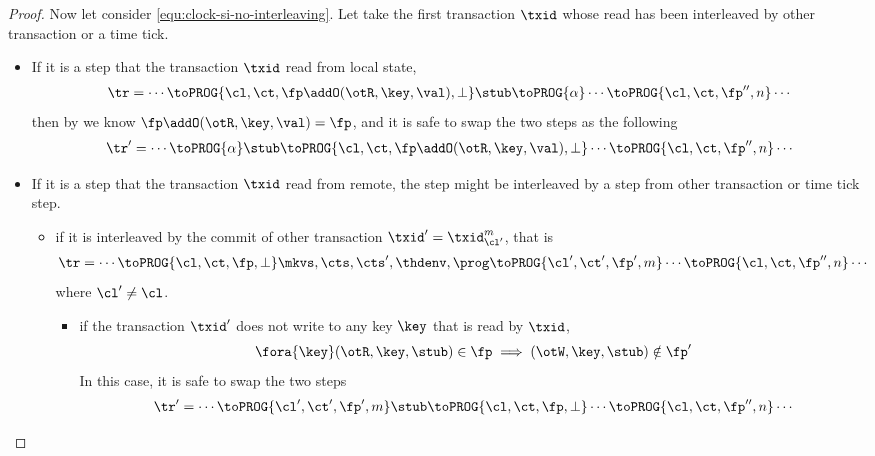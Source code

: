 \begin{proof}
    Now let consider \cref{equ:clock-si-no-interleaving}.
    Let take the first transaction \( \txid \) whose read has been interleaved by other transaction or a time tick.
    \begin{itemize}
        \item If it is a step that the transaction \( \txid \) read from local state,
        \[
        \begin{array}{@{}l@{}}
            \tr = \cdots \toPROG{\cl,\ct,\fp \addO (\otR, \key, \val ),\perp} \stub  \toPROG{\alpha} \cdots  \toPROG{\cl,\ct,\fp'',n} \cdots \\
        \end{array}
        \]
        then by  we know \( \fp \addO (\otR, \key, \val ) = \fp\), and it is safe to swap the two steps as the following
        \[
        \begin{array}{@{}l@{}}
            \tr' = \cdots \toPROG{\alpha} \stub \toPROG{\cl,\ct,\fp \addO (\otR, \key, \val ),\perp} \cdots \toPROG{\cl,\ct,\fp'',n} \cdots \\
        \end{array}
        \]
        \item If it is a step that the transaction \( \txid \) read from remote, 
            the step might be interleaved by a step from other transaction or time tick step.
        \begin{itemize}                                                                       
            \item if it is interleaved by the commit of other transaction \( \txid' = \txid_{\cl'}^m \), that is
        \[
        \begin{array}{@{}l@{}}
            \tr = \cdots \toPROG{\cl,\ct,\fp,\perp} \mkvs, \cts, \cts', \thdenv, \prog  \toPROG{\cl',\ct',\fp',m} \cdots \toPROG{\cl,\ct,\fp'',n} \cdots \\
        \end{array}
        \]
        where \( \cl' \neq \cl \).
        \begin{itemize}
            \item if the transaction \( \txid' \) does not write to any key \( \key \) that is read by \( \txid \),
                \[
                    \fora{\key} (\otR, \key, \stub) \in \fp \implies (\otW, \key, \stub) \notin \fp'
                \]
            In this case, it is safe to swap the two steps
            \[
            \begin{array}{@{}l@{}}
                \tr' = \cdots \toPROG{\cl',\ct',\fp',m} \stub \toPROG{\cl,\ct,\fp,\perp} \cdots \toPROG{\cl,\ct,\fp'',n} \cdots \\

\end{array}\]
\end{itemize}
\end{itemize}
\end{itemize}
\end{proof}
